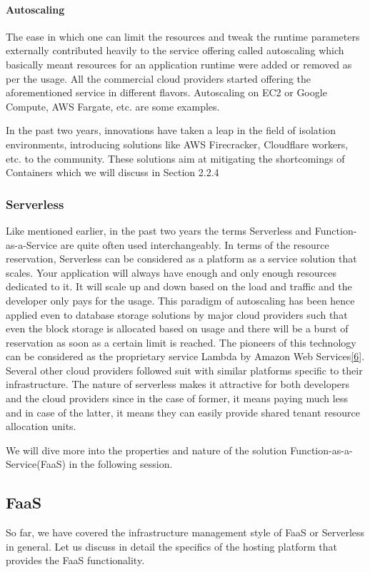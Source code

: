 \documentclass[12pt,titlepage]{article}
\begin{document}
\paragraph{Autoscaling}
\label{sec:org64de244}
The ease in which one can limit the resources and tweak the runtime parameters externally contributed heavily
to the service offering called autoscaling which basically meant resources for an
application runtime were added or removed as per the usage. All the commercial
cloud providers started offering the aforementioned service in different
flavors. Autoscaling on EC2 or Google Compute, AWS Fargate, etc. are some examples.

In the past two years, innovations have taken a leap in the field of isolation
environments, introducing solutions like AWS Firecracker, Cloudflare workers,
etc. to the community. These solutions aim at mitigating the shortcomings of
Containers which we will discuss in Section 2.2.4

\subsubsection{Serverless}
\label{sec:orgedaf2ad}
Like mentioned earlier, in the past two years the terms Serverless and Function-as-a-Service are quite
often used interchangeably. In terms of the resource reservation, Serverless can
be considered as a platform as a service solution that scales. Your application
will always have enough and only enough resources dedicated to it. It will scale
up and down based on the load and traffic and the developer only pays for the usage.
This paradigm of autoscaling has been hence applied even to database storage
solutions by major cloud providers such that even the block storage is allocated
based on usage and there will be a burst of reservation as soon as a certain
limit is reached.
The pioneers of this technology can be considered as the proprietary service
Lambda by Amazon Web Services\hyperref[ref:6]{[6}]. Several other cloud providers followed suit
with similar platforms specific to their infrastructure.
The nature of serverless makes it attractive for both developers and the cloud
providers since in the case of former, it means paying much less and in case of
the latter, it means they can easily provide shared tenant resource allocation
units.

We will dive more into the properties and nature of the solution
Function-as-a-Service(FaaS) in the following session.

\subsection{FaaS}
\label{sec:orgc45b248}
So far, we have covered the infrastructure management style of FaaS or
Serverless in general. Let us discuss in detail the specifics of the
hosting platform that provides the FaaS functionality.
\end{document}
